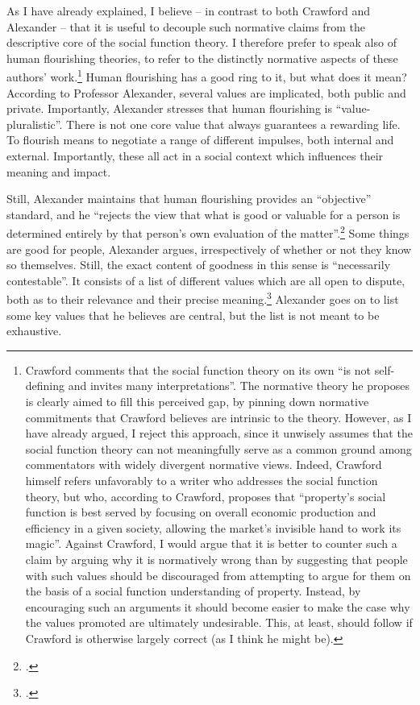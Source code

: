 As I have already explained, I believe -- in contrast to both Crawford and Alexander -- that it is useful to decouple such normative claims from the descriptive core of the social function theory. I therefore prefer to speak also of human flourishing theories, to refer to the distinctly normative aspects of these authors' work.\footnote{Crawford comments that the social function theory on its own  ``is not self-defining and invites many interpretations''. The normative theory he proposes is clearly aimed to fill this perceived gap, by pinning down normative commitments that Crawford believes are intrinsic to the theory. However, as I have already argued, I reject this approach, since it unwisely assumes that the social function theory can not meaningfully serve as a common ground among commentators with widely divergent normative views. Indeed, Crawford himself refers unfavorably to a writer who addresses the social function theory, but who, according to Crawford, proposes that ``property's social function is best served by
focusing on overall economic production and efficiency in a given society, allowing the market's invisible hand to work its magic''. Against Crawford, I would argue that it is better to counter such a claim by arguing why it is normatively wrong than by suggesting that people with such values should be discouraged from attempting to argue for them on the basis of a social function understanding of property. Instead, by encouraging such an arguments it should become easier to make the case why the values promoted are ultimately undesirable. This, at least, should follow if Crawford is otherwise largely correct (as I think he might be).}
Human flourishing has a good ring to it, but what does it mean? According to Professor Alexander, several values are implicated, both public and private. Importantly, Alexander stresses that human flourishing is ``value-pluralistic''. There is not one core value that always guarantees a rewarding life. To flourish means to negotiate a range of different impulses, both internal and external. Importantly, these all act in a social context which influences their meaning and impact. 

Still, Alexander maintains that human flourishing provides an ``objective'' standard, and he ``rejects the view that
what is good or valuable for a person is determined entirely by that person's own evaluation of the matter''.\footcite[1263]{alexander14} Some things are good for people, Alexander argues, irrespectively of whether or not they know so themselves. Still, the exact content of goodness in this sense is ``necessarily contestable''. It consists of a list of different values which are all open to dispute, both as to their relevance and their precise meaning.\footcite[1263]{alexander14} Alexander goes on to list some key values that he believes are central, but the list is not meant to be exhaustive.


